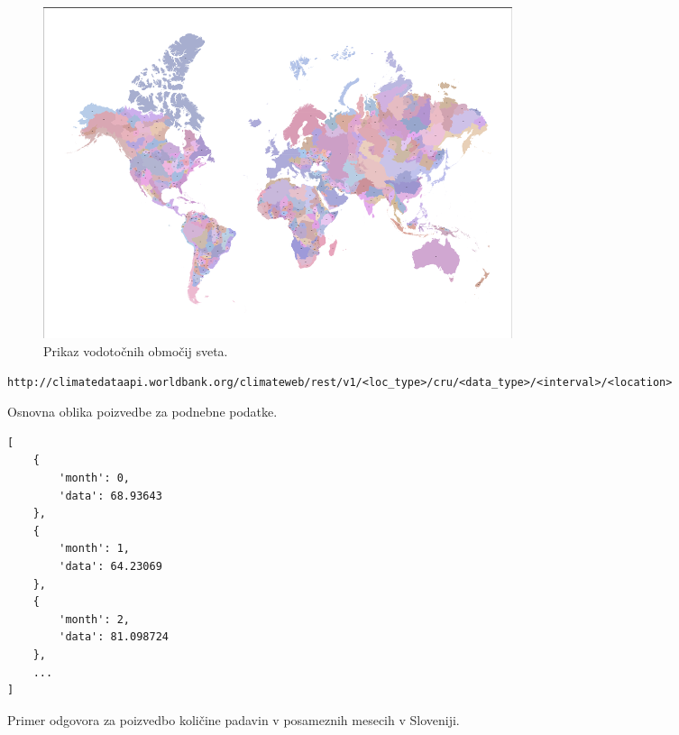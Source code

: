 \begin{figure}
\begin{center}
\includegraphics[width=13.75cm]{pic/climate_data_api_basins.pdf}
\end{center}
\caption{Prikaz vodotočnih območij sveta.}
\label{climate_data_api_basins}
\end{figure} 


\begin{snippet}
\begin{center}
\begin{lstlisting}
http://climatedataapi.worldbank.org/climateweb/rest/v1/<loc_type>/cru/<data_type>/<interval>/<location>
\end{lstlisting}
\end{center}
\caption{Osnovna oblika poizvedbe za podnebne podatke.}
\label{climate_dataset_request}
\end{snippet} 


\begin{snippet}
\begin{center}
\begin{lstlisting}
[
    {
        'month': 0,
        'data': 68.93643
    },
    {
        'month': 1,
        'data': 64.23069
    },
    {
        'month': 2,
        'data': 81.098724
    },
    ...
]
\end{lstlisting}
\end{center}
\caption{Primer odgovora za poizvedbo količine padavin v posameznih mesecih v 
  Sloveniji.}
\label{climate_dataset_response}
\end{snippet} 






